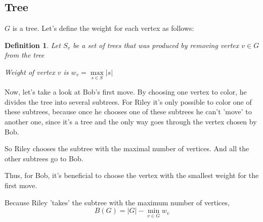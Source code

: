 \documentclass[12pt,a4paper, flushleft]{article}
\newtheorem{Def}{Definition}[section]
\begin{document}
\subsection{Tree} $G$ is a tree. Let's define the weight for each vertex as follows:
	
	\begin{Def}
		Let $S_v$ be a set of trees that was produced by removing vertex $v\in G$ from the tree
		
		Weight of vertex $v$ is $w_v = \max\limits_{s\in S}|s|$
	\end{Def}
	
	Now, let's take a look at Bob's first move. By choosing one vertex to color, he divides the tree into several subtrees. For Riley it's only possible to color one of these subtrees, because once he chooses one of these subtrees he can't 'move' to another one, since it's a tree and the only way goes through the vertex chosen by Bob. 
	
	So Riley chooses the subtree with the maximal number of vertices. And all the other subtrees go to Bob.
	
	Thus, for Bob, it's beneficial to choose the vertex with the smallest weight for the first move. 
	
	Because Riley 'takes' the subtree with the maximum number of vertices, $$B(G) = |G| - \min\limits_{v\in G} w_v$$
	
\end{document}
